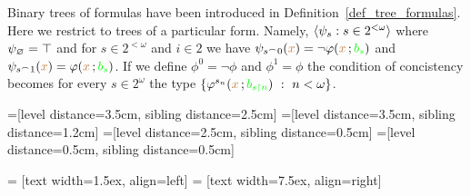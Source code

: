 \documentclass[creche.tex]{subfiles}
\begin{document}
Binary trees of formulas have been introduced in Definition~\ref{def_tree_formulas}.
Here we restrict to trees of a particular form.
Namely, $\langle\psi_s:s\in 2^{<\omega}\rangle$  where $\psi_\varnothing=\top$ and for $s\in 2^{<\omega}$ and $i\in 2$ we have $\psi_{s^\frown 0}({\color{brown} x})=\neg\varphi({\color{brown} x}\,;{\color{green} b_s})$ and $\psi_{s^\frown 1}({\color{brown} x})=\varphi({\color{brown} x}\,;{\color{green} b_s})$.
If we define $\phi^0=\neg\phi$ and $\phi^1=\phi$ the condition of concistency becomes for every $s\in 2^\omega$ the type $\{\varphi^{s_n}({\color{brown} x}\,;{\color{green} b_{s\restriction n}})\ :\ n<\omega\}$.


=[level distance=3.5cm, sibling distance=2.5cm]
=[level distance=3.5cm, sibling distance=1.2cm]
=[level distance=2.5cm, sibling distance=0.5cm]
=[level distance=0.5cm, sibling distance=0.5cm]

 = [text width=1.5ex, align=left]
 = [text width=7.5ex, align=right]

\def\leaf{...}
\end{document}

